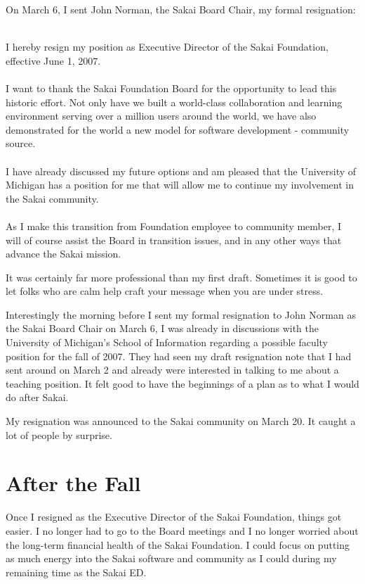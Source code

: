 \documentclass[12pt]{book}
\begin{document}
On March 6, I sent John Norman, the Sakai Board Chair, my formal resignation:\\
\\
\begin{sf}
I hereby resign my position as Executive Director of the Sakai
Foundation, effective June 1, 2007.\\
\\
I want to thank the Sakai Foundation Board for the opportunity to
lead this historic effort.  Not only have we built a world-class
collaboration and learning environment serving over a million users
around the world, we have also demonstrated for the world a new
model for software development - community source.\\
\\
I have already discussed my future options and am pleased that
the University of Michigan has a position for me that will allow
me to continue my involvement in the Sakai community.\\
\\
As I make this transition from Foundation employee to community
member, I will of course assist the Board in transition issues,
and in any other ways that advance the Sakai mission.\\
\end{sf}

It was certainly far more professional than my first draft.  Sometimes
it is good to let folks who are calm help craft your message when you
are under stress.

Interestingly the morning before I sent my formal resignation to
John Norman as the Sakai Board Chair on March 6, I was already in
discussions with the University of Michigan's School of Information
regarding a possible faculty position for the fall of 2007.  They had seen my
draft resignation note that I had sent around on March 2 and already
were interested in talking to me about a teaching position.
It felt good to have the beginnings of a plan as to what I would do
after Sakai.

My resignation was announced to the Sakai community on March 20.
It caught a lot of people by surprise.

\chapter{After the Fall}

Once I resigned as the Executive Director of the Sakai Foundation,
things got easier.   I no longer had to go to the Board meetings and
I no longer worried about the long-term financial health of the
Sakai Foundation.   I could focus on putting as much energy into the
Sakai software and community as I could during my remaining time as
the Sakai ED.
\end{document}
